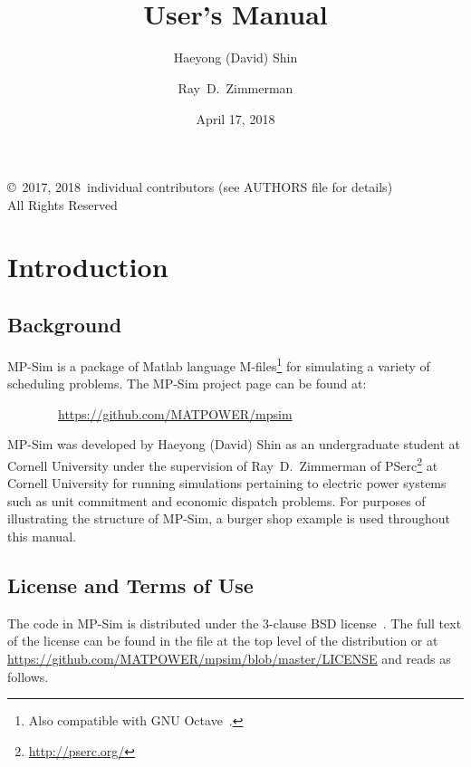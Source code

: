 \documentclass[12pt]{article}
\title{\mpsim{} \mpsimver{}\\
User's Manual}
\author{Haeyong (David) Shin \and Ray~D.~Zimmerman}
\date{April 17, 2018} %
\newcommand{\matlab}[0]{{\sc Matlab}}
\newcommand{\mpsim}[0]{{MP-Sim}}
\newcommand{\mpsimurl}[0]{https://github.com/MATPOWER/mpsim}
\newcommand{\pserc}[0]{{\sc PSerc}}
\newcommand{\code}[1]{{\relsize{-0.5}{\tt{{#1}}}}}  %
\numberwithin{equation}{section}
\numberwithin{table}{section}
\numberwithin{figure}{section}
\begin{document}
\maketitle
\thispagestyle{empty}
\vfill
\begin{center}
{\scriptsize
\copyright~2017, 2018~individual contributors (see AUTHORS file for details)\\
All Rights Reserved}
\end{center}

\clearpage
\tableofcontents
\clearpage
\listoffigures
\listoftables

\clearpage
\section{Introduction}

\subsection{Background}

\mpsim{} is a package of \matlab{} language M-files\footnote{Also compatible with GNU Octave~\cite{octave}.} for simulating a variety of scheduling problems. The \mpsim{} project page can be found at:

\bigskip

~~~~~~~~\url{\mpsimurl}

\bigskip

\mpsim{} was developed by Haeyong (David) Shin as an undergraduate student at Cornell University under the supervision of Ray~D.~Zimmerman of \pserc{}\footnote{\url{http://pserc.org/}} at Cornell University for running simulations pertaining to electric power systems such as unit commitment and economic dispatch problems.  For purposes of illustrating the structure of \mpsim{}, a burger shop example is used throughout this manual.

\clearpage
\subsection{License and Terms of Use}

The code in \mpsim{} is distributed under the 3-clause BSD license~\cite{bsd}. The full text of the license can be found in the \code{LICENSE} file at the top level of the distribution or at \url{https://github.com/MATPOWER/mpsim/blob/master/LICENSE} and reads as follows.
\end{document}
